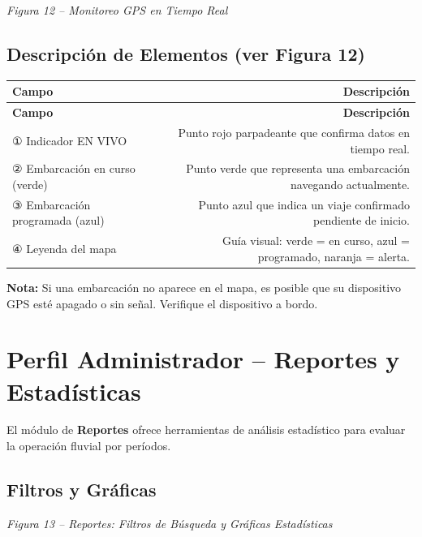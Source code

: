 \documentclass[12pt,a4paper]{article}
\begin{document}
\textit{Figura 12 -- Monitoreo GPS en Tiempo Real}

\subsection{Descripción de Elementos (ver Figura 12)}

\begin{longtable}{LR}
  \toprule
  \textbf{Campo} & \textbf{Descripción} \\
  \midrule
  \endfirsthead
  \toprule
  \textbf{Campo} & \textbf{Descripción} \\
  \midrule
  \endhead
  \bottomrule
  \endfoot
  ① Indicador EN VIVO           & Punto rojo parpadeante que confirma datos en tiempo real. \\[4pt]
  ② Embarcación en curso (verde) & Punto verde que representa una embarcación navegando actualmente. \\[4pt]
  ③ Embarcación programada (azul) & Punto azul que indica un viaje confirmado pendiente de inicio. \\[4pt]
  ④ Leyenda del mapa            & Guía visual: verde = en curso, azul = programado, naranja = alerta. \\
\end{longtable}

\begin{notabox}
\textbf{Nota:} Si una embarcación no aparece en el mapa, es posible que su dispositivo GPS esté apagado o sin señal. Verifique el dispositivo a bordo.
\end{notabox}

\section{Perfil Administrador -- Reportes y Estadísticas}

El módulo de \textbf{Reportes} ofrece herramientas de análisis estadístico para evaluar la operación fluvial por períodos.

\subsection{Filtros y Gráficas}

\textit{Figura 13 -- Reportes: Filtros de Búsqueda y Gráficas Estadísticas}
\end{document}
